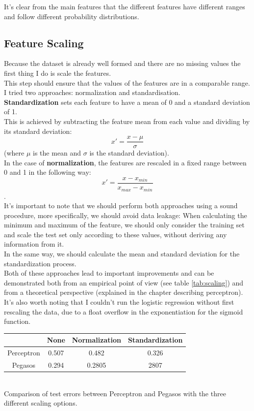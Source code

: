 It's clear from the main features that the different features have different ranges and follow different probability distributions.

\subsection{Feature Scaling}
Because the dataset is already well formed and there are no missing values the first thing I do is scale the features.\\
This step should ensure that the values of the features are in a comparable range.\\
I tried two approaches: normalization and standardisation.\\
\textbf{Standardization} sets each feature to have a mean of 0 and a standard deviation of 1.\\
This is achieved by subtracting the feature mean from each value and dividing by its standard deviation:
$$x' = \frac{x - \mu}{\sigma} $$
(where $\mu$ is the mean and $\sigma$ is the standard deviation).\\
In the case of \textbf{normalization}, the features are rescaled in a fixed range between 0 and 1 in the following way: $$x' = \frac{x - x_{min}}{x_{max} - x_{min}} $$.\\
It's important to note that we should perform both approaches using a sound procedure, more specifically, we should avoid data leakage:
When calculating the minimum and maximum of the feature, we should only consider the training set and scale the test set only according to these values, without deriving any information from it.\\
In the same way, we should calculate the mean and standard deviation for the standardization process.\\
Both of these approaches lead to important improvements and can be demonstrated both from an empirical point of view (see table \ref{tab:scaling}) and from a theoretical perspective (explained in the chapter describing perceptron).
It's also worth noting that I couldn't run the logistic regression without first rescaling the data, due to a float overflow in the exponentiation for the sigmoid function.\\

\begin{center}
    \begin{tabular}{| c | c | c | c |}
    \hline
    & None & Normalization & Standardization  \\
    \hline
    Perceptron & 0.507 & 0.482 & 0.326  \\
    \hline
    Pegasos & 0.294 &  0.2805 & 2807 \\
    \hline
    \end{tabular}\\
    \label{tab:scaling}
    Comparison of test errors between Perceptron and Pegasos with the three different scaling options.\\
\end{center}

